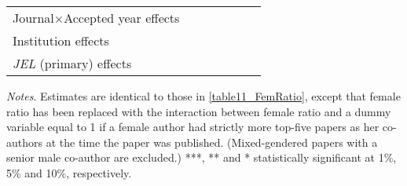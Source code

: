 \begin{table}
\begin{threeparttable}
\begin{tabular}{p{3.78cm}S@{}S@{}S@{}S@{}S@{}S@{}}
            Journal\(\times\)Accepted year effects &               &               &           {}   &               &               &           {}   \\
            Institution effects           &           {}   &           {}   &           {}   &           {}   &           {}   &           {}   \\
            \textit{JEL} (primary) effects&               &               &               &           {}   &           {}   &           {}   \\
            \bottomrule
        \end{tabular}
        \begin{tablenotes}
            \tiny
            \item \textit{Notes}. Estimates are identical to those in \autoref{table11_FemRatio}, except that female ratio has been replaced with the interaction between female ratio and a dummy variable equal to 1 if a female author had strictly more top-five papers as her co-authors at the time the paper was published. (Mixed-gendered papers with a senior male co-author are excluded.) ***, ** and * statistically significant at 1\%, 5\% and 10\%, respectively.
        \end{tablenotes}
    \end{threeparttable}
\end{table}
